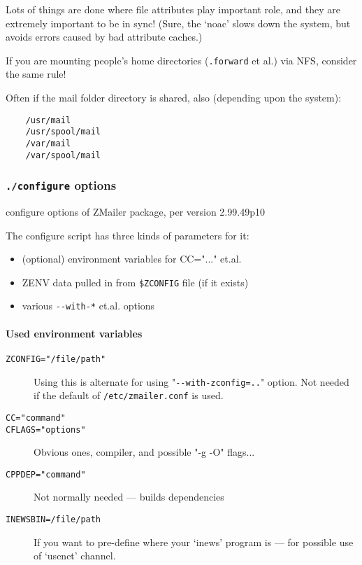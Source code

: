 Lots of things are done where file attributes play important
role, and they are extremely important to be in sync!
(Sure, the `noac' slows down the system, but avoids errors
caused by bad attribute caches.)

If you are mounting people's home directories ({\tt .forward} et al.)
via NFS, consider the same rule!

Often if the mail folder directory is shared, also (depending upon the system):
\begin{verbatim}
    /usr/mail
    /usr/spool/mail
    /var/mail
    /var/spool/mail
\end{verbatim}


\subsubsection{{\tt ./configure} options}%
%
%
\label{configure_options_list}

configure  options of ZMailer package, per version 2.99.49p10


The  configure  script has three kinds of parameters for it:
\begin{itemize}
\item (optional) environment variables for CC="..." et.al.
\item ZENV data pulled in from {\tt \$ZCONFIG} file (if it exists)
\item various  \verb/--with-*/  et.al. options
\end{itemize}


\paragraph{Used environment variables}

\begin{description}
\item[\tt ZCONFIG="/file/path"] \mbox{}

Using this is alternate for using "\verb/--with-zconfig=../" option.
Not needed if the default of {\tt /etc/zmailer.conf} is used.

\item[\tt CC="command"]
\item[\tt CFLAGS="options"] \mbox{}

Obvious ones, compiler, and possible "-g -O" flags...

\item[\tt CPPDEP="command"] \mbox{}

Not normally needed --- builds dependencies

\item[\tt INEWSBIN=/file/path] \mbox{}

If you want to pre-define where your `inews' program
is --- for possible use of `usenet' channel.
\end{description}

